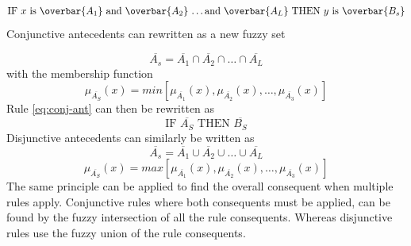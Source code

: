 \begin{equation}
    \text {IF $x$ is $\overbar{A_1}$ and $\overbar{A_2}$ \dots and $\overbar{A_L}$ THEN $y$ is $\overbar{B_s}$}
    \label{eq:conj-ant}
\end{equation}
Conjunctive antecedents can rewritten as a new fuzzy set

\[ \overbar{A_s}=\overbar{A_1}\cap \overbar{A_2} \cap \dots \cap \overbar{A_L} \]
with the membership function
\[ \mu_{\overbar{A_S}}(x)=min \left [\mu_{\overbar{A_1}}(x),\mu_{\overbar{A_2}}(x),\dots,\mu_{\overbar{A_3}}(x) \right ] \]
Rule \ref{eq:conj-ant} can then be rewritten as
\[ \text{IF $\overbar{A_S}$ THEN $\overbar{B_S}$} \]
Disjunctive antecedents can similarly be written as
\[ \overbar{A_s}=\overbar{A_1}\cup \overbar{A_2} \cup \dots \cup \overbar{A_L} \]
\[ \mu_{\overbar{A_S}}(x)=max \left [\mu_{\overbar{A_1}}(x),\mu_{\overbar{A_2}}(x),\dots,\mu_{\overbar{A_3}}(x) \right ] \]
The same principle can be applied to find the overall consequent when multiple rules apply. Conjunctive rules where both consequents must be applied, can be found by  the fuzzy intersection of all the rule consequents. Whereas disjunctive rules use the fuzzy union of the rule consequents.

